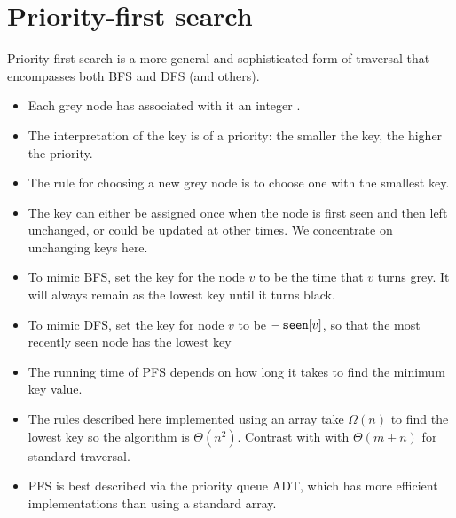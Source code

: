 \section{Priority-first search} \label{sec:PFS}
Priority-first search is a more general and sophisticated form of traversal that encompasses both BFS and DFS (and others). 

\begin{itemize}
	\item Each grey node has associated with it an integer . 
	\item The interpretation of the key is of a priority: 
	the smaller the key, the higher the priority. 
	\item The rule for choosing a new grey node is to choose one with the smallest key.  
	\item The key can either be assigned once when the node is first seen and then left unchanged, 
	or could be updated at other times. We concentrate on unchanging keys here.
	\item To mimic BFS, set the key for the node $v$ to be the time that $v$ turns grey. 
	It will always remain as the lowest key until it turns black.
	\item To mimic DFS, set the key for node $v$ to be $-\operatorname{\text{\texttt{seen}}}[v]$, 
	so that the most recently seen node has the lowest key
	\item The running time of PFS depends on how long it takes to find the minimum key value.
	\item The rules described here implemented using an array take $\Omega(n)$ to find the lowest key 
	so the algorithm is $\Theta(n^2)$. Contrast with with $\Theta(m+n)$ for standard traversal.
	\item PFS is best described via the priority queue ADT, 
	which has more efficient implementations than using a standard array.
\end{itemize}

